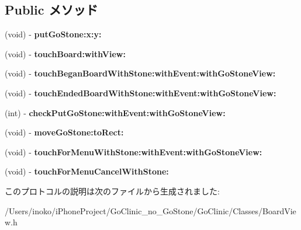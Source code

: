 \subsection*{Public メソッド}
\begin{DoxyCompactItemize}
\item 
\hypertarget{protocol_board_view_delegate-p_ad0d33bf44affc3968942b067298b27e1}{
(void) -\/ {\bfseries putGoStone:x:y:}}
\label{protocol_board_view_delegate-p_ad0d33bf44affc3968942b067298b27e1}

\item 
\hypertarget{protocol_board_view_delegate-p_ae27882adf09c3c45fca26507c2ebbf61}{
(void) -\/ {\bfseries touchBoard:withView:}}
\label{protocol_board_view_delegate-p_ae27882adf09c3c45fca26507c2ebbf61}

\item 
\hypertarget{protocol_board_view_delegate-p_a75390bd4c876b71554b923a5535bf92d}{
(void) -\/ {\bfseries touchBeganBoardWithStone:withEvent:withGoStoneView:}}
\label{protocol_board_view_delegate-p_a75390bd4c876b71554b923a5535bf92d}

\item 
\hypertarget{protocol_board_view_delegate-p_a0f4b2f994e74394a65b54bd69c21c5be}{
(void) -\/ {\bfseries touchEndedBoardWithStone:withEvent:withGoStoneView:}}
\label{protocol_board_view_delegate-p_a0f4b2f994e74394a65b54bd69c21c5be}

\item 
\hypertarget{protocol_board_view_delegate-p_aa6d7749ac3e452a0efadd556d8cbea08}{
(int) -\/ {\bfseries checkPutGoStone:withEvent:withGoStoneView:}}
\label{protocol_board_view_delegate-p_aa6d7749ac3e452a0efadd556d8cbea08}

\item 
\hypertarget{protocol_board_view_delegate-p_ab54d6613216df24e372a5f76dd8ee381}{
(void) -\/ {\bfseries moveGoStone:toRect:}}
\label{protocol_board_view_delegate-p_ab54d6613216df24e372a5f76dd8ee381}

\item 
\hypertarget{protocol_board_view_delegate-p_a6f9e2096e1d19ff722211568411bccd0}{
(void) -\/ {\bfseries touchForMenuWithStone:withEvent:withGoStoneView:}}
\label{protocol_board_view_delegate-p_a6f9e2096e1d19ff722211568411bccd0}

\item 
\hypertarget{protocol_board_view_delegate-p_aadc288eb1b4da3347ffce2a655c2eb21}{
(void) -\/ {\bfseries touchForMenuCancelWithStone:}}
\label{protocol_board_view_delegate-p_aadc288eb1b4da3347ffce2a655c2eb21}

\end{DoxyCompactItemize}


このプロトコルの説明は次のファイルから生成されました:\begin{DoxyCompactItemize}
\item 
/Users/inoko/iPhoneProject/GoClinic\_\-no\_\-GoStone/GoClinic/Classes/BoardView.h\end{DoxyCompactItemize}
